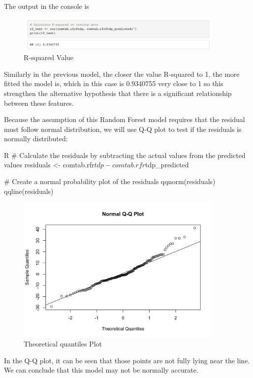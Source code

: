 The output in the console is
\begin{figure}[H]
    \centering
    \includegraphics[width=0.9\textwidth]{graphics/RsquaredRandom.png}
    \caption{R-squared Value}
    \label{fig:RSV}
\end{figure}

Similarly in the previous model, the closer the value R-squared to 1, the more fitted the model is, which in this case is 0.9340755 very close to 1 so this strengthen the alternative hypothesis that there is a significant relationship between these features.

Because the assumption of this Random Forest model requires that the residual must follow normal distribution, we will use Q-Q plot to test if the residuals is normally distributed:
\begin{code}{R}
# Calculate the residuals by subtracting the actual values from the predicted values
residuals <- comtab.rfr$tdp - comtab.rfr$tdp_predicted

# Create a normal probability plot of the residuals
qqnorm(residuals)
qqline(residuals)
\end{code}
\begin{figure}[H]
    \centering
    \includegraphics[width=0.9\textwidth]{graphics/randomQQplot.png}
    \caption{Theoretical quantiles Plot}
    \label{fig:QQ}
\end{figure}

In the Q-Q plot, it can be seen that those points are not fully lying near the line. We can conclude that this model may not be normally accurate.\\

